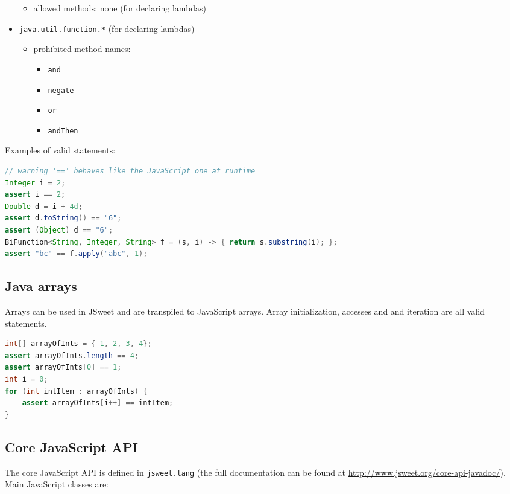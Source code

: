 \documentclass[a4paper]{report}
\begin{document}
\begin{itemize}
\begin{itemize}
	\item allowed methods: none (for declaring lambdas)
	\end{itemize}
\item \texttt{java.util.function.*} (for declaring lambdas)
	\begin{itemize}
	\item prohibited method names: 
			\begin{itemize}
				\item \texttt{and}
				\item \texttt{negate} 
				\item \texttt{or}
				\item \texttt{andThen}
			\end{itemize}
	\end{itemize}
\end{itemize}

\noindent
Examples of valid statements:

\begin{lstlisting}[language=Java]
// warning '==' behaves like the JavaScript one at runtime
Integer i = 2;
assert i == 2;
Double d = i + 4d;
assert d.toString() == "6";
assert (Object) d == "6";
BiFunction<String, Integer, String> f = (s, i) -> { return s.substring(i); };
assert "bc" == f.apply("abc", 1);
\end{lstlisting}

\subsection{Java arrays}

Arrays can be used in JSweet and are transpiled to JavaScript arrays. Array initialization, accesses and and iteration are all valid statements.

\begin{lstlisting}[language=Java]
int[] arrayOfInts = { 1, 2, 3, 4};
assert arrayOfInts.length == 4;  
assert arrayOfInts[0] == 1;
int i = 0;
for (int intItem : arrayOfInts) { 
	assert arrayOfInts[i++] == intItem;
}
\end{lstlisting}

\subsection{Core JavaScript API}

The core JavaScript API is defined in \texttt{jsweet.lang} (the full documentation can be found at \url{http://www.jsweet.org/core-api-javadoc/}). Main JavaScript classes are:
\end{document}
